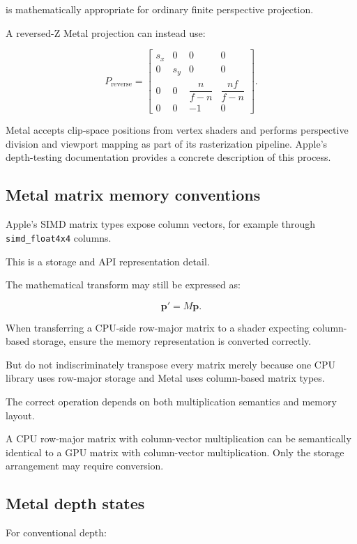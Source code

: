is mathematically appropriate for ordinary finite perspective projection.

A reversed-Z Metal projection can instead use:

\[
 P_{\mathrm{reverse}}= \begin{bmatrix} s_x&0&0&0\\ 0&s_y&0&0\\ 0&0&\dfrac n{f-n}&\dfrac{nf}{f-n}\\ 0&0&-1&0 \end{bmatrix}.
\]

Metal accepts clip-space positions from vertex shaders and performs perspective division and viewport mapping as part of its rasterization pipeline. Apple's depth-testing documentation provides a concrete description of this process. 

\subsection{Metal matrix memory conventions}\label{02-foundations-ii-ch033-metal-matrix-memory-conventions}

Apple's SIMD matrix types expose column vectors, for example through \texttt{simd\_float4x4} columns.

This is a storage and API representation detail.

The mathematical transform may still be expressed as:

\[
 \mathbf p'=M\mathbf p.
\]

When transferring a CPU-side row-major matrix to a shader expecting column-based storage, ensure the memory representation is converted correctly.

But do not indiscriminately transpose every matrix merely because one CPU library uses row-major storage and Metal uses column-based matrix types.

The correct operation depends on both multiplication semantics and memory layout.

A CPU row-major matrix with column-vector multiplication can be semantically identical to a GPU matrix with column-vector multiplication. Only the storage arrangement may require conversion.

\subsection{Metal depth states}\label{02-foundations-ii-ch033-metal-depth-states}

For conventional depth:

